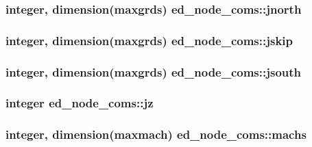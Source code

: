 \subsubsection[{jnorth}]{\setlength{\rightskip}{0pt plus 5cm}integer, dimension(maxgrds) ed\+\_\+node\+\_\+coms\+::jnorth}\label{namespaceed__node__coms_afd254e42e760f8e20809b89c6862f940}
\hypertarget{namespaceed__node__coms_a9427f37c650ec53e118b58d7e64e5aee}{}
\subsubsection[{jskip}]{\setlength{\rightskip}{0pt plus 5cm}integer, dimension(maxgrds) ed\+\_\+node\+\_\+coms\+::jskip}\label{namespaceed__node__coms_a9427f37c650ec53e118b58d7e64e5aee}
\hypertarget{namespaceed__node__coms_a1c7e45eb29343f70f7789155ffb43673}{}
\subsubsection[{jsouth}]{\setlength{\rightskip}{0pt plus 5cm}integer, dimension(maxgrds) ed\+\_\+node\+\_\+coms\+::jsouth}\label{namespaceed__node__coms_a1c7e45eb29343f70f7789155ffb43673}
\hypertarget{namespaceed__node__coms_a58a0ce85c36bbb54b835b48d62281519}{}
\subsubsection[{jz}]{\setlength{\rightskip}{0pt plus 5cm}integer ed\+\_\+node\+\_\+coms\+::jz}\label{namespaceed__node__coms_a58a0ce85c36bbb54b835b48d62281519}
\hypertarget{namespaceed__node__coms_ad169e35de47cf7f3b0f522cec093e003}{}
\subsubsection[{machs}]{\setlength{\rightskip}{0pt plus 5cm}integer, dimension(maxmach) ed\+\_\+node\+\_\+coms\+::machs}\label{namespaceed__node__coms_ad169e35de47cf7f3b0f522cec093e003}
\hypertarget{namespaceed__node__coms_a07ddd50e92be990673b9c78656aaade5}{}
